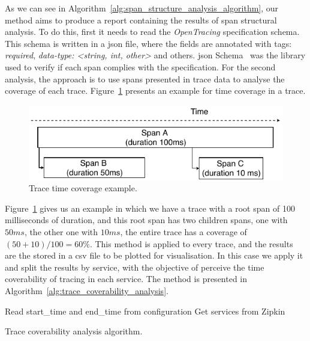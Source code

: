 As we can see in Algorithm~\ref{alg:span_structure_analysis_algorithm}, our method aims to produce a report containing the results of span structural analysis. To do this, first it needs to read the \emph{OpenTracing} specification schema. This schema is written in a \gls{json} file, where the fields are annotated with tags: \emph{required}, \emph{data-type: <string, int, other>} and others. \gls{json} Schema~\cite{json_schema_library} was the library used to verify if each span complies with the specification. For the second analysis, the approach is to use spans presented in trace data to analyse the coverage of each trace. Figure~\ref{fig:trace_time_coverage} presents an example for time coverage in a trace.

\begin{figure}[H]
    \centering\includegraphics[width=0.8\linewidth]{images/trace_time_coverage_example.pdf}
    \caption{Trace time coverage example.}
    \label{fig:trace_time_coverage}
\end{figure}

Figure~\ref{fig:trace_time_coverage} gives us an example in which we have a trace with a root span of 100 milliseconds of duration, and this root span has two children spans, one with $50ms$, the other one with $10ms$, the entire trace has a coverage of $(50+10)/100=60\%$. This method is applied to every trace, and the results are the stored in a \gls{csv} file to be plotted for visualisation. In this case we apply it and split the results by service, with the objective of perceive the time coverability of tracing in each service. The method is presented in Algorithm~\ref{alg:trace_coverability_analysis}.

\begin{algorithm}
    Read start\_time and end\_time from configuration\;
    Get services from Zipkin\;
    \caption{Trace coverability analysis algorithm.}
    \label{alg:trace_coverability_analysis}
\end{algorithm}

